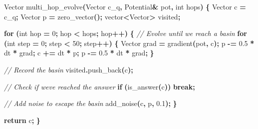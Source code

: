 \documentclass[
  11pt,
  a4paper,
]{article}
\newenvironment{Shaded}{\begin{snugshade}}{\end{snugshade}}
\newcommand{\CommentTok}[1]{\textcolor[rgb]{0.56,0.35,0.01}{\textit{#1}}}
\newcommand{\ControlFlowTok}[1]{\textcolor[rgb]{0.13,0.29,0.53}{\textbf{#1}}}
\newcommand{\DataTypeTok}[1]{\textcolor[rgb]{0.13,0.29,0.53}{#1}}
\newcommand{\DecValTok}[1]{\textcolor[rgb]{0.00,0.00,0.81}{#1}}
\newcommand{\FloatTok}[1]{\textcolor[rgb]{0.00,0.00,0.81}{#1}}
\newcommand{\NormalTok}[1]{#1}
\newcommand{\OperatorTok}[1]{\textcolor[rgb]{0.81,0.36,0.00}{\textbf{#1}}}
\begin{document}
\begin{Shaded}
\begin{Highlighting}[]
\NormalTok{Vector multi\_hop\_evolve}\OperatorTok{(}\NormalTok{Vector c\_q}\OperatorTok{,}\NormalTok{ Potential}\OperatorTok{\&}\NormalTok{ pot}\OperatorTok{,} \DataTypeTok{int}\NormalTok{ hops}\OperatorTok{)} \OperatorTok{\{}
\NormalTok{    Vector c }\OperatorTok{=}\NormalTok{ c\_q}\OperatorTok{;}
\NormalTok{    Vector p }\OperatorTok{=}\NormalTok{ zero\_vector}\OperatorTok{();}
\NormalTok{    vector}\OperatorTok{\textless{}}\NormalTok{Vector}\OperatorTok{\textgreater{}}\NormalTok{ visited}\OperatorTok{;}
    
    \ControlFlowTok{for} \OperatorTok{(}\DataTypeTok{int}\NormalTok{ hop }\OperatorTok{=} \DecValTok{0}\OperatorTok{;}\NormalTok{ hop }\OperatorTok{\textless{}}\NormalTok{ hops}\OperatorTok{;}\NormalTok{ hop}\OperatorTok{++)} \OperatorTok{\{}
        \CommentTok{// Evolve until we reach a basin}
        \ControlFlowTok{for} \OperatorTok{(}\DataTypeTok{int}\NormalTok{ step }\OperatorTok{=} \DecValTok{0}\OperatorTok{;}\NormalTok{ step }\OperatorTok{\textless{}} \DecValTok{50}\OperatorTok{;}\NormalTok{ step}\OperatorTok{++)} \OperatorTok{\{}
\NormalTok{            Vector grad }\OperatorTok{=}\NormalTok{ gradient}\OperatorTok{(}\NormalTok{pot}\OperatorTok{,}\NormalTok{ c}\OperatorTok{);}
\NormalTok{            p }\OperatorTok{{-}=} \FloatTok{0.5} \OperatorTok{*}\NormalTok{ dt }\OperatorTok{*}\NormalTok{ grad}\OperatorTok{;}
\NormalTok{            c }\OperatorTok{+=}\NormalTok{ dt }\OperatorTok{*}\NormalTok{ p}\OperatorTok{;}
\NormalTok{            p }\OperatorTok{{-}=} \FloatTok{0.5} \OperatorTok{*}\NormalTok{ dt }\OperatorTok{*}\NormalTok{ grad}\OperatorTok{;}
        \OperatorTok{\}}
        
        \CommentTok{// Record the basin}
\NormalTok{        visited}\OperatorTok{.}\NormalTok{push\_back}\OperatorTok{(}\NormalTok{c}\OperatorTok{);}
        
        \CommentTok{// Check if we\textquotesingle{}ve reached the answer}
        \ControlFlowTok{if} \OperatorTok{(}\NormalTok{is\_answer}\OperatorTok{(}\NormalTok{c}\OperatorTok{))} \ControlFlowTok{break}\OperatorTok{;}
        
        \CommentTok{// Add noise to escape the basin}
\NormalTok{        add\_noise}\OperatorTok{(}\NormalTok{c}\OperatorTok{,}\NormalTok{ p}\OperatorTok{,} \FloatTok{0.1}\OperatorTok{);}
    \OperatorTok{\}}
    
    \ControlFlowTok{return}\NormalTok{ c}\OperatorTok{;}
\OperatorTok{\}}
\end{Highlighting}
\end{Shaded}
\end{document}

